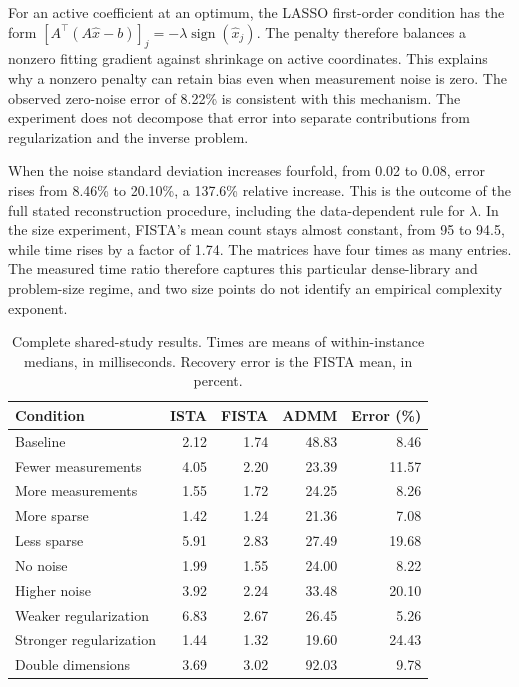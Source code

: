 \documentclass{article}
\begin{document}
For an active coefficient at an optimum, the LASSO first-order condition has the form $[A^\top(A\widehat x-b)]_j=-\lambda\operatorname{sign}(\widehat x_j)$. The penalty therefore balances a nonzero fitting gradient against shrinkage on active coordinates. This explains why a nonzero penalty can retain bias even when measurement noise is zero. The observed zero-noise error of 8.22\% is consistent with this mechanism. The experiment does not decompose that error into separate contributions from regularization and the inverse problem.

When the noise standard deviation increases fourfold, from 0.02 to 0.08, error rises from 8.46\% to 20.10\%, a 137.6\% relative increase. This is the outcome of the full stated reconstruction procedure, including the data-dependent rule for $\lambda$. In the size experiment, FISTA's mean count stays almost constant, from 95 to 94.5, while time rises by a factor of 1.74. The matrices have four times as many entries. The measured time ratio therefore captures this particular dense-library and problem-size regime, and two size points do not identify an empirical complexity exponent.

\begin{table}[htbp]\centering
\caption{Complete shared-study results. Times are means of within-instance medians, in milliseconds. Recovery error is the FISTA mean, in percent.}\label{tab:results}
\small\begin{tabular}{lrrrr}\toprule
Condition & ISTA & FISTA & ADMM & Error (\%)\\\midrule
Baseline &2.12&1.74&48.83&8.46\\
Fewer measurements &4.05&2.20&23.39&11.57\\
More measurements &1.55&1.72&24.25&8.26\\
More sparse &1.42&1.24&21.36&7.08\\
Less sparse &5.91&2.83&27.49&19.68\\
No noise &1.99&1.55&24.00&8.22\\
Higher noise &3.92&2.24&33.48&20.10\\
Weaker regularization &6.83&2.67&26.45&5.26\\
Stronger regularization &1.44&1.32&19.60&24.43\\
Double dimensions &3.69&3.02&92.03&9.78\\\bottomrule
\end{tabular}\end{table}

\FloatBarrier
\end{document}
